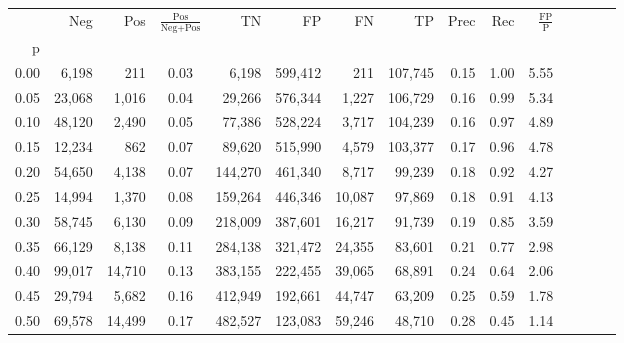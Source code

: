 \begin{tabular}{rrrcrrrrrrrrrrr}
\toprule
{} &     Neg &     Pos & $\frac{\text{Pos}}{\text{Neg}+\text{Pos}}$ &       TN &       FP &       FN &       TP &  Prec &   Rec & $\frac{\text{FP}}{\text{P}}$ \\
p    &         &         &                                            &          &          &          &          &       &       &                              \\
\midrule
0.00 &   6,198 &     211 &                                       0.03 &    6,198 &  599,412 &      211 &  107,745 &  0.15 &  1.00 &                         5.55 \\
0.05 &  23,068 &   1,016 &                                       0.04 &   29,266 &  576,344 &    1,227 &  106,729 &  0.16 &  0.99 &                         5.34 \\
0.10 &  48,120 &   2,490 &                                       0.05 &   77,386 &  528,224 &    3,717 &  104,239 &  0.16 &  0.97 &                         4.89 \\
0.15 &  12,234 &     862 &                                       0.07 &   89,620 &  515,990 &    4,579 &  103,377 &  0.17 &  0.96 &                         4.78 \\
0.20 &  54,650 &   4,138 &                                       0.07 &  144,270 &  461,340 &    8,717 &   99,239 &  0.18 &  0.92 &                         4.27 \\
0.25 &  14,994 &   1,370 &                                       0.08 &  159,264 &  446,346 &   10,087 &   97,869 &  0.18 &  0.91 &                         4.13 \\
0.30 &  58,745 &   6,130 &                                       0.09 &  218,009 &  387,601 &   16,217 &   91,739 &  0.19 &  0.85 &                         3.59 \\
0.35 &  66,129 &   8,138 &                                       0.11 &  284,138 &  321,472 &   24,355 &   83,601 &  0.21 &  0.77 &                         2.98 \\
0.40 &  99,017 &  14,710 &                                       0.13 &  383,155 &  222,455 &   39,065 &   68,891 &  0.24 &  0.64 &                         2.06 \\
0.45 &  29,794 &   5,682 &                                       0.16 &  412,949 &  192,661 &   44,747 &   63,209 &  0.25 &  0.59 &                         1.78 \\
0.50 &  69,578 &  14,499 &                                       0.17 &  482,527 &  123,083 &   59,246 &   48,710 &  0.28 &  0.45 &                         1.14 \\

\end{tabular}

